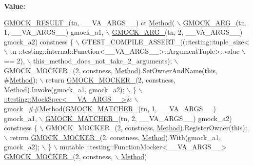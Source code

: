 {\bfseries Value\+:}
\begin{DoxyCode}
\hyperlink{gmock-generated-function-mockers_8h_a0e9d94e9c77df84f1103af06feee1077}{GMOCK\_RESULT\_}(tn, \_\_VA\_ARGS\_\_) ct \hyperlink{gmock-spec-builders__test_8cc_a95606368148f3e5aab5db46c32466afd}{Method}( \(\backslash\)
      \hyperlink{gmock-generated-function-mockers_8h_a887575cc1c31158fba808180a10c004f}{GMOCK\_ARG\_}(tn, 1, \_\_VA\_ARGS\_\_) gmock\_a1, \(\backslash\)
      \hyperlink{gmock-generated-function-mockers_8h_a887575cc1c31158fba808180a10c004f}{GMOCK\_ARG\_}(tn, 2, \_\_VA\_ARGS\_\_) gmock\_a2) constness \{ \(\backslash\)
    GTEST\_COMPILE\_ASSERT\_((::testing::tuple\_size<                          \(\backslash\)
        tn ::testing::internal::Function<\_\_VA\_ARGS\_\_>::ArgumentTuple>::value \(\backslash\)
            == 2), \(\backslash\)
        this\_method\_does\_not\_take\_2\_arguments); \(\backslash\)
    GMOCK\_MOCKER\_(2, constness, \hyperlink{gmock-spec-builders__test_8cc_a95606368148f3e5aab5db46c32466afd}{Method}).SetOwnerAndName(\textcolor{keyword}{this}, #\hyperlink{gmock-spec-builders__test_8cc_a95606368148f3e5aab5db46c32466afd}{Method}); \(\backslash\)
    return \hyperlink{gmock-generated-function-mockers_8h_a7d362499e27b1bc3a9806dd3cf58a5b7}{GMOCK\_MOCKER\_}(2, constness, \hyperlink{gmock-spec-builders__test_8cc_a95606368148f3e5aab5db46c32466afd}{Method}).Invoke(gmock\_a1, gmock\_a2); \(\backslash\)
  \} \(\backslash\)
  \hyperlink{classtesting_1_1internal_1_1_mock_spec}{::testing::MockSpec<\_\_VA\_ARGS\_\_>}& \(\backslash\)
      gmock\_##\hyperlink{gmock-spec-builders__test_8cc_a95606368148f3e5aab5db46c32466afd}{Method}(\hyperlink{gmock-generated-function-mockers_8h_aa87d0009fe91f1c89d658776b55a769c}{GMOCK\_MATCHER\_}(tn, 1, \_\_VA\_ARGS\_\_) gmock\_a1, \(\backslash\)
                     \hyperlink{gmock-generated-function-mockers_8h_aa87d0009fe91f1c89d658776b55a769c}{GMOCK\_MATCHER\_}(tn, 2, \_\_VA\_ARGS\_\_) gmock\_a2) constness \{ \(\backslash\)
    GMOCK\_MOCKER\_(2, constness, \hyperlink{gmock-spec-builders__test_8cc_a95606368148f3e5aab5db46c32466afd}{Method}).RegisterOwner(\textcolor{keyword}{this}); \(\backslash\)
    return \hyperlink{gmock-generated-function-mockers_8h_a7d362499e27b1bc3a9806dd3cf58a5b7}{GMOCK\_MOCKER\_}(2, constness, \hyperlink{gmock-spec-builders__test_8cc_a95606368148f3e5aab5db46c32466afd}{Method}).With(gmock\_a1, gmock\_a2); \(\backslash\)
  \} \(\backslash\)
  mutable ::testing::FunctionMocker<\_\_VA\_ARGS\_\_> \hyperlink{gmock-generated-function-mockers_8h_a7d362499e27b1bc3a9806dd3cf58a5b7}{GMOCK\_MOCKER\_}(2, constness, \(\backslash\)
      \hyperlink{gmock-spec-builders__test_8cc_a95606368148f3e5aab5db46c32466afd}{Method})
\end{DoxyCode}
\mbox{\label{gmock-generated-function-mockers_8h_af7c77ba511c631de02bb8c45a6ed3045}} 
